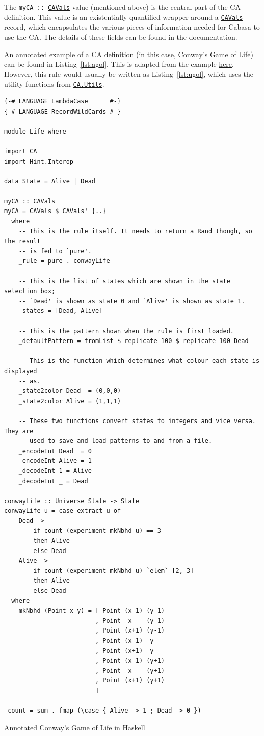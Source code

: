 \documentclass[oneside,a4paper]{memoir}
\newcommand\hreftt[2]{\href{#1}{\texttt{#2}}}
\begin{document}
The \texttt{myCA ::\ \href{haskell/Hint-Interop.html\#t:CAVals}{CAVals}} value (mentioned above) is the central part of the CA definition.
This value is an existentially quantified wrapper around a \hreftt{haskell/Hint-Interop.html\#t:CAVals-39-}{CAVals\textquotesingle} record,
  which encapsulates the various pieces of information needed for Cabasa to use the CA.
The details of these fields can be found in the documentation.

An annotated example of a CA definition (in this case, Conway's Game of Life) can be found in Listing~\ref{lst:agol}.
This is adapted from the example \href{haskell/CA.html}{here}.
However, this rule would usually be written as Listing~\ref{lst:ugol},
  which uses the utility functions from \href{haskell/CA-Utils.html}{\texttt{CA.Utils}}.

\begin{listing}
\begin{verbatim}
{-# LANGUAGE LambdaCase      #-}
{-# LANGUAGE RecordWildCards #-}

module Life where

import CA
import Hint.Interop

data State = Alive | Dead

myCA :: CAVals
myCA = CAVals $ CAVals' {..}
  where
    -- This is the rule itself. It needs to return a Rand though, so the result
    -- is fed to `pure'.
    _rule = pure . conwayLife

    -- This is the list of states which are shown in the state selection box;
    -- `Dead' is shown as state 0 and `Alive' is shown as state 1.
    _states = [Dead, Alive]

    -- This is the pattern shown when the rule is first loaded.
    _defaultPattern = fromList $ replicate 100 $ replicate 100 Dead

    -- This is the function which determines what colour each state is displayed
    -- as.
    _state2color Dead  = (0,0,0)
    _state2color Alive = (1,1,1)

    -- These two functions convert states to integers and vice versa. They are
    -- used to save and load patterns to and from a file.
    _encodeInt Dead  = 0
    _encodeInt Alive = 1
    _decodeInt 1 = Alive
    _decodeInt _ = Dead

conwayLife :: Universe State -> State
conwayLife u = case extract u of
    Dead ->
        if count (experiment mkNbhd u) == 3
        then Alive
        else Dead
    Alive ->
        if count (experiment mkNbhd u) `elem` [2, 3]
        then Alive
        else Dead
  where
    mkNbhd (Point x y) = [ Point (x-1) (y-1)
                         , Point  x    (y-1)
                         , Point (x+1) (y-1)
                         , Point (x-1)  y
                         , Point (x+1)  y
                         , Point (x-1) (y+1)
                         , Point  x    (y+1)
                         , Point (x+1) (y+1)
                         ]

 count = sum . fmap (\case { Alive -> 1 ; Dead -> 0 })
\end{verbatim}
\caption{Annotated Conway's Game of Life in Haskell}
\label{lst:agol}
\end{listing}
\end{document}
